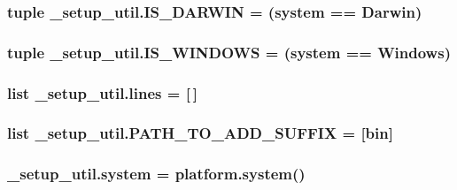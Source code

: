 \subsubsection[{\texorpdfstring{I\+S\+\_\+\+D\+A\+R\+W\+IN}{IS_DARWIN}}]{\setlength{\rightskip}{0pt plus 5cm}tuple \+\_\+setup\+\_\+util.\+I\+S\+\_\+\+D\+A\+R\+W\+IN = ({\bf system} == \textquotesingle{}Darwin\textquotesingle{})}\hypertarget{namespace__setup__util_aecbb100ce6f94bb3c7e16d58fde05f96}{}\label{namespace__setup__util_aecbb100ce6f94bb3c7e16d58fde05f96}
\subsubsection[{\texorpdfstring{I\+S\+\_\+\+W\+I\+N\+D\+O\+WS}{IS_WINDOWS}}]{\setlength{\rightskip}{0pt plus 5cm}tuple \+\_\+setup\+\_\+util.\+I\+S\+\_\+\+W\+I\+N\+D\+O\+WS = ({\bf system} == \textquotesingle{}Windows\textquotesingle{})}\hypertarget{namespace__setup__util_a6fe69c2dbd92959b6651a28cbb846e6e}{}\label{namespace__setup__util_a6fe69c2dbd92959b6651a28cbb846e6e}
\subsubsection[{\texorpdfstring{lines}{lines}}]{\setlength{\rightskip}{0pt plus 5cm}list \+\_\+setup\+\_\+util.\+lines = \mbox{[}$\,$\mbox{]}}\hypertarget{namespace__setup__util_a8618d8be5f729d4c9696daa5e083a001}{}\label{namespace__setup__util_a8618d8be5f729d4c9696daa5e083a001}
\subsubsection[{\texorpdfstring{P\+A\+T\+H\+\_\+\+T\+O\+\_\+\+A\+D\+D\+\_\+\+S\+U\+F\+F\+IX}{PATH_TO_ADD_SUFFIX}}]{\setlength{\rightskip}{0pt plus 5cm}list \+\_\+setup\+\_\+util.\+P\+A\+T\+H\+\_\+\+T\+O\+\_\+\+A\+D\+D\+\_\+\+S\+U\+F\+F\+IX = \mbox{[}\textquotesingle{}bin\textquotesingle{}\mbox{]}}\hypertarget{namespace__setup__util_a7de27b8c021c888c6288a885f1e9afa9}{}\label{namespace__setup__util_a7de27b8c021c888c6288a885f1e9afa9}
\subsubsection[{\texorpdfstring{system}{system}}]{\setlength{\rightskip}{0pt plus 5cm}\+\_\+setup\+\_\+util.\+system = platform.\+system()}\hypertarget{namespace__setup__util_ae9fca6a80a6923f4580be72f68fee325}{}\label{namespace__setup__util_ae9fca6a80a6923f4580be72f68fee325}
